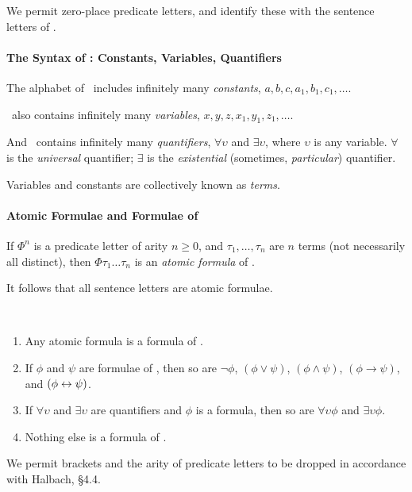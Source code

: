   We permit zero-place predicate letters, and identify these with the sentence letters of \lone. 

\paragraph{The Syntax of \ltwo: Constants, Variables, Quantifiers}

The alphabet of \ltwo\  includes infinitely many \emph{constants}, $a,b,c,a_{1},b_{1},c_{1},\ldots$.

\ltwo\ also contains infinitely many \emph{variables}, $x,y,z,x_{1},y_{1},z_{1},\ldots$.

And \ltwo\ contains infinitely many \emph{quantifiers}, $\forall \upsilon$ and $\exists \upsilon$, where $\upsilon$ is any variable. $\forall$ is the \emph{universal} quantifier; $\exists$ is the \emph{existential} (sometimes, \emph{particular}) quantifier.

  Variables and constants are collectively known as \emph{terms}.

\paragraph{Atomic Formulae and Formulae  of \ltwo}

\begin{definition}
	If $\Phi^{n}$ is a predicate letter of arity $n\geqslant 0$, and $\tau_{1},\ldots,\tau_{n}$ are $n$ terms (not necessarily all distinct), then $\Phi\tau_{1}\ldots\tau_{n}$ is an \emph{atomic formula} of \ltwo.
\end{definition} It follows that all sentence letters are atomic formulae.

\begin{definition}[Formula]~

	\begin{enumerate}
		\item Any atomic formula is a formula of \ltwo.
		\item If $\phi$ and $\psi$ are formulae of \ltwo, then so are $\neg\phi$, $(\phi\vee\psi)$, $(\phi\wedge\psi)$, $(\phi \to \psi)$, and $(\phi\leftrightarrow\psi)$.
		\item If $\forall\upsilon$ and $\exists\upsilon$ are quantifiers and $\phi$ is a formula, then so are $\forall\upsilon \phi$ and $\exists\upsilon \phi$.
		\item Nothing else is a formula of \ltwo.
	\end{enumerate}
\end{definition}We permit brackets and the arity of predicate letters to be dropped in accordance with Halbach, \S 4.4.

